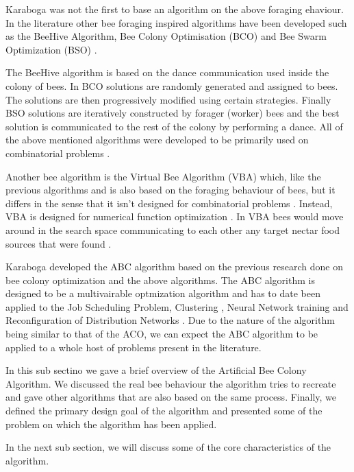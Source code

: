 Karaboga was not the first to base an algorithm on the above foraging ehaviour. In the literature other bee foraging inspired algorithms have been developed such as the BeeHive Algorithm, Bee Colony Optimisation (BCO) and Bee Swarm Optimization (BSO) \cite{BCO,HybridABCClustering,ABCNumericalOptimization}. 

The BeeHive algorithm is based on the dance communication used inside the colony of bees. In BCO solutions are randomly generated and assigned to bees\cite{HybridABCClustering,ABCNumericalOptimization}. The solutions are then progressively modified using certain strategies. Finally BSO solutions are iteratively constructed by forager (worker) bees and the best solution is communicated to the rest of the colony by performing a dance\cite{HybridABCClustering,ABCNumericalOptimization}. All of the above mentioned algorithms were developed to be primarily used on combinatorial problems \cite{ABCCompareStudy}.

Another bee algorithm is the Virtual Bee Algorithm (VBA) which, like the previous algorithms and is also based on the foraging behaviour of bees, but it differs in the sense that it isn't designed for combinatorial problems \cite{ABCNumericalOptimization}. Instead, VBA is designed for numerical function optimization \cite{ABCNumericalOptimization}. In VBA bees would move around in the search space communicating to each other any target nectar food sources that were found \cite{ABCNumericalOptimization}.

Karaboga developed the ABC algorithm based on the previous research done on bee colony optimization and the above algorithms. The ABC algorithm is designed to be a multivairable optmization algorithm and has to date been applied to the Job Scheduling Problem, Clustering \cite{HybridABCClustering}, Neural Network training and Reconfiguration of Distribution Networks \cite{ABCReconfigDistro}. Due to the nature of the algorithm being similar to that of the ACO, we can expect the ABC algorithm to be applied to a whole host of problems present in the literature.

In this sub sectino we gave a brief overview of the Artificial Bee Colony Algorithm. We discussed the real bee behaviour the algorithm tries to recreate and  gave other algorithms that are also based on the same process. Finally, we defined the primary design goal of the algorithm and presented some of the problem on which the algorithm has been applied.

In the next sub section, we will discuss some of the core characteristics of the algorithm.
